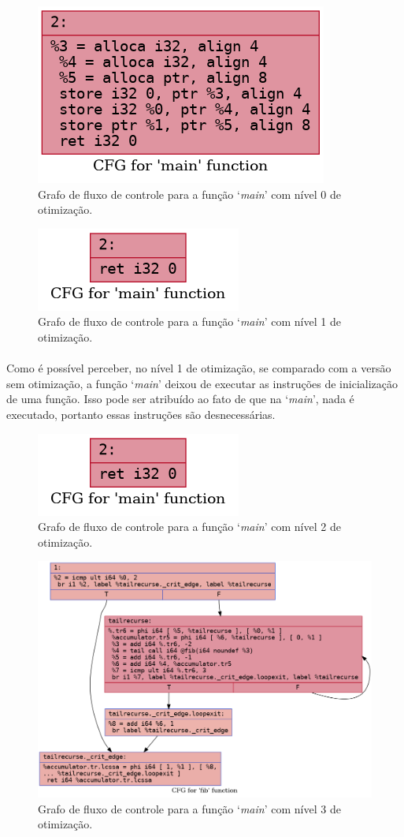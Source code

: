\documentclass[12pt]{article}
\begin{document}
\begin{figure}
    \centering
    \includegraphics[width=0.5\linewidth]{private_.main_O0.png}
    \caption{Grafo de fluxo de controle para a função ‘\textit{main}’ com nível 0 de otimização.}
\end{figure}

\begin{figure}
    \centering
    \includegraphics[width=0.5\linewidth]{private_.main_O1.png}
    \caption{Grafo de fluxo de controle para a função ‘\textit{main}’ com nível 1 de otimização.}
\end{figure}

\paragraph{}Como é possível perceber, no nível 1 de otimização, se comparado com a versão sem otimização, a função ‘\textit{main}’ deixou de executar as instruções de inicialização de uma função. Isso pode ser atribuído ao fato de que na ‘\textit{main}’, nada é executado, portanto essas instruções são desnecessárias.

\begin{figure}
    \centering
    \includegraphics[width=0.5\linewidth]{private_.main_O2.png}
    \caption{Grafo de fluxo de controle para a função ‘\textit{main}’ com nível 2 de otimização.}
\end{figure}

\begin{figure}
    \centering
    \includegraphics[width=0.5\linewidth]{fib2_.fib_O3.png}
    \caption{Grafo de fluxo de controle para a função ‘\textit{main}’ com nível 3 de otimização.}
\end{figure}
\end{document}
